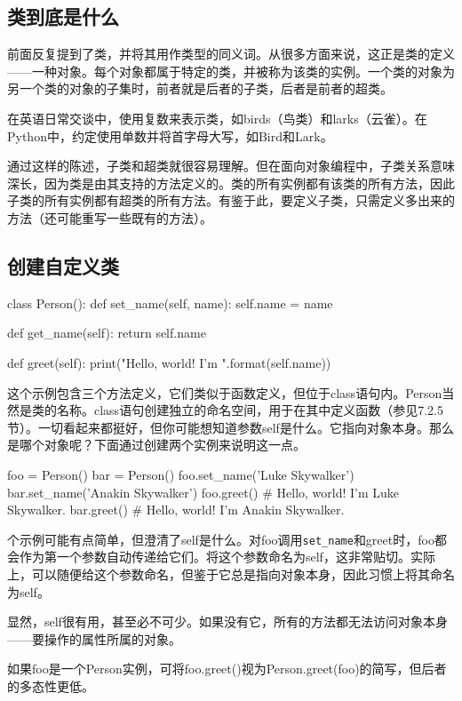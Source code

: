 \subsection{类到底是什么}
前面反复提到了类，并将其用作类型的同义词。从很多方面来说，这正是类的定义------一种对象。每个对象都属于特定的类，并被称为该类的实例。一个类的对象为另一个类的对象的子集时，前者就是后者的子类，后者是前者的超类。

\begin{tcolorbox}
    在英语日常交谈中，使用复数来表示类，如birds（鸟类）和larks（云雀）。在Python中，约定使用单数并将首字母大写，如Bird和Lark。
\end{tcolorbox}

通过这样的陈述，子类和超类就很容易理解。但在面向对象编程中，子类关系意味深长，因为类是由其支持的方法定义的。类的所有实例都有该类的所有方法，因此子类的所有实例都有超类的所有方法。有鉴于此，要定义子类，只需定义多出来的方法（还可能重写一些既有的方法）。
\subsection{创建自定义类}
\begin{pyc}
class Person():
    def set_name(self, name):
        self.name = name

    def get_name(self):
        return self.name

    def greet(self):
        print("Hello, world! I'm {}".format(self.name))
\end{pyc}
这个示例包含三个方法定义，它们类似于函数定义，但位于class语句内。Person当然是类的名称。class语句创建独立的命名空间，用于在其中定义函数（参见7.2.5节）。一切看起来都挺好，但你可能想知道参数self是什么。它指向对象本身。那么是哪个对象呢？下面通过创建两个实例来说明这一点。
\begin{pyc}
foo = Person()
bar = Person()
foo.set_name('Luke Skywalker')
bar.set_name('Anakin Skywalker')
foo.greet()  # Hello, world! I'm Luke Skywalker.
bar.greet()  # Hello, world! I'm Anakin Skywalker.
\end{pyc}
个示例可能有点简单，但澄清了self是什么。对foo调用\verb|set_name|和greet时，foo都会作为第一个参数自动传递给它们。将这个参数命名为self，这非常贴切。实际上，可以随便给这个参数命名，但鉴于它总是指向对象本身，因此习惯上将其命名为self。

显然，self很有用，甚至必不可少。如果没有它，所有的方法都无法访问对象本身------要操作的属性所属的对象。

\begin{tcolorbox}
    如果foo是一个Person实例，可将foo.greet()视为Person.greet(foo)的简写，但后者的多态性更低。
\end{tcolorbox}

